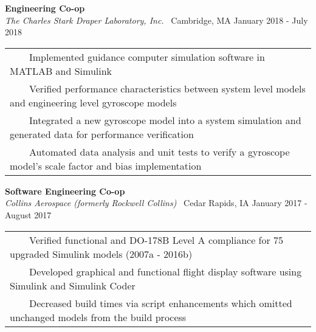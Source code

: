 \documentclass[overlapped, 11pt]{res}
\newcommand{\tabitem}{~~\textbullet~~}
\begin{document}
\begin{resume}
\begin{itemize}
            
            \vspace{0.25em}
            \textbf{Engineering Co-op}\\
            \emph{The Charles Stark Draper Laboratory, Inc.} \textbar 
                \ Cambridge, MA \hfill January 2018 - July 2018
            \begin{tabular}{l}
                \tabitem Implemented guidance computer simulation software in MATLAB and Simulink \\
                \tabitem Verified performance characteristics between system level models and engineering level gyroscope models \\
                \tabitem Integrated a new gyroscope model into a system simulation and generated data for performance verification \\
                \tabitem Automated data analysis and unit tests to verify a gyroscope model's scale factor and bias implementation \\
            \end{tabular}

            \vspace{0.25em}
            \textbf{Software Engineering Co-op}\\
            \emph{Collins Aerospace (formerly Rockwell Collins)} \textbar 
                \ Cedar Rapids, IA \hfill January 2017 - August 2017
            \begin{tabular}{l}
                \tabitem Verified functional and DO-178B Level A compliance for 75 upgraded Simulink models (2007a - 2016b) \\
                \tabitem Developed graphical and functional flight display software using Simulink and Simulink Coder \\
                \tabitem Decreased build times via script enhancements which omitted unchanged models from the build process \\
            \end{tabular}
            

\end{itemize}
\end{resume}
\end{document}
